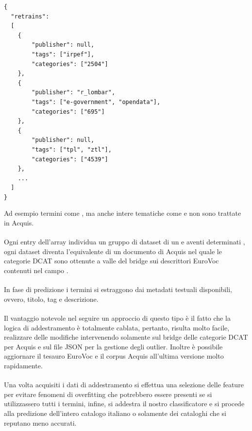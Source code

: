 \documentclass{article}
\theoremstyle{plain}
\theoremstyle{definition}
\begin{document}
\begin{verbatim}
{
  "retrains": 
  [  
  	{
        "publisher": null,
        "tags": ["irpef"],
        "categories": ["2504"]
    },
  	{
        "publisher": "r_lombar",
        "tags": ["e-government", "opendata"],
        "categories": ["695"]
    },
    {
        "publisher": null,
        "tags": ["tpl", "ztl"], 
        "categories": ["4539"]
    },
    ...
  ]  
}
\end{verbatim}
Ad esempio termini come , ma anche intere tematiche come  e  non sono trattate in Acquis.
\\
\\
Ogni entry dell'array  individua un gruppo di dataset di un  e aventi  determinati , ogni dataset diventa l'equivalente di un documento di Acquis nel quale le categorie DCAT sono ottenute a valle del bridge sui descrittori EuroVoc contenuti nel campo .
\\
\\
In fase di predizione i termini si estraggono dai metadati testuali disponibili, ovvero, titolo, tag e descrizione.
\\
\\
Il vantaggio notevole nel seguire un approccio di questo tipo è il fatto che la logica di addestramento è totalmente cablata, pertanto, risulta molto facile, realizzare delle modifiche intervenendo solamente sul bridge delle categorie DCAT per Acquis e sul file JSON per la gestione degli outlier. Inoltre è possibile aggiornare il tesauro EuroVoc e il corpus Acquis all'ultima versione molto rapidamente.
\\
\\
Una volta acquisiti i dati di addestramento si effettua una selezione delle feature per evitare fenomeni di overfitting che potrebbero essere presenti se si utilizzassero tutti i termini, infine, si addestra il nostro classificatore e si procede alla predizione dell'intero catalogo italiano o solamente dei cataloghi che si reputano meno accurati.
\end{document}
